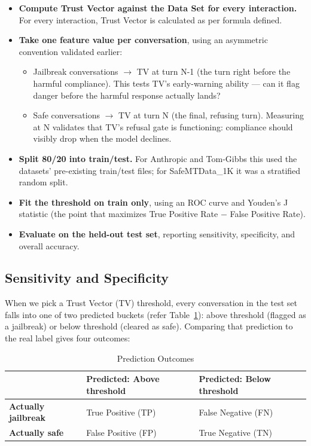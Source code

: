 \documentclass[conference]{IEEEtran}
\begin{document}
\begin{itemize}
    
    \item \textbf{Compute Trust Vector against the Data Set for every interaction.} For every interaction, Trust Vector is calculated as per formula defined. 
    \item \textbf{Take one feature value per conversation}, using an asymmetric convention validated earlier:
    \begin{itemize}
        \item Jailbreak conversations $\rightarrow$ TV at turn N-1 (the turn right before the harmful compliance). This tests TV’s early-warning ability — can it flag danger before the harmful response actually lands?
        \item Safe conversations $\rightarrow$ TV at turn N (the final, refusing turn). Measuring at N validates that TV’s refusal gate is functioning: compliance should visibly drop when the model declines.
    \end{itemize}
    \item \textbf{Split 80/20 into train/test.} For Anthropic and Tom-Gibbs this used the datasets’ pre-existing train/test files; for SafeMTData\_1K it was a stratified random split.
    \item \textbf{Fit the threshold on train only}, using an ROC curve and Youden’s J statistic (the point that maximizes True Positive Rate $-$ False Positive Rate).
    \item \textbf{Evaluate on the held-out test set}, reporting sensitivity, specificity, and overall accuracy.
\end{itemize}

\subsection{Sensitivity and Specificity}
When we pick a Trust Vector (TV) threshold, every conversation in the test set falls into one of two predicted buckets (refer Table~\ref{tab:PO}): above threshold (flagged as a jailbreak) or below threshold (cleared as safe). Comparing that prediction to the real label gives four outcomes:

\begin{table}[htbp]
\centering
\caption{Prediction Outcomes}
\begin{tabularx}{\linewidth}{l X X}
\toprule
& \textbf{Predicted: Above threshold} & \textbf{Predicted: Below threshold} \\
\midrule
\textbf{Actually jailbreak} & True Positive (TP) & False Negative (FN) \\
\textbf{Actually safe} & False Positive (FP) & True Negative (TN) \\
\bottomrule
\end{tabularx}
\label{tab:PO}
\end{table}
\end{document}
